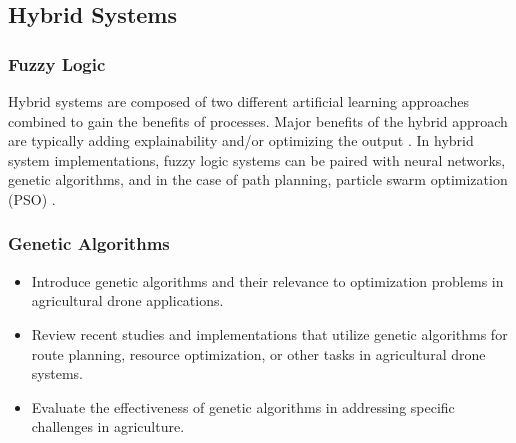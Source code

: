 \documentclass{IEEEtran}
\begin{document}
\subsection{Hybrid Systems}
    \subsubsection{Fuzzy Logic}
    Hybrid systems are composed of two different artificial learning approaches combined to gain the benefits of processes. Major benefits of the hybrid approach are
    typically adding explainability and/or optimizing the output \cite{key4}  \cite{key5}.  In hybrid system implementations, fuzzy logic systems can be paired
    with neural networks, genetic algorithms, and in the case of path planning, particle swarm optimization (PSO) \cite{key5}. 
    \subsubsection{Genetic Algorithms}
        \begin{itemize}
            \item Introduce genetic algorithms and their relevance to optimization problems in agricultural drone applications.
            \item Review recent studies and implementations that utilize genetic algorithms for route planning, resource optimization, or other tasks in agricultural drone systems.
            \item Evaluate the effectiveness of genetic algorithms in addressing specific challenges in agriculture.
        \end{itemize}
\end{document}

